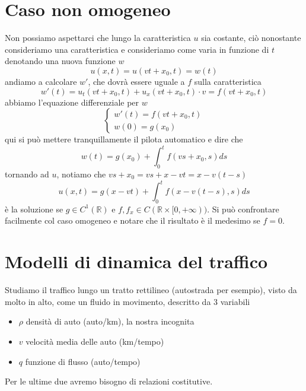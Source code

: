 \documentclass[10pt,a4paper,twoside,openright]{book}
\begin{document}
\section{Caso non omogeneo}

Non possiamo aspettarci che lungo la caratteristica $u$ sia costante, ciò nonostante consideriamo una caratteristica e consideriamo come varia in funzione di $t$ denotando una nuova funzione $w$
\begin{equation*}
	u(x,t) = u( vt+x_{0} ,t) =w( t)
\end{equation*}
andiamo a calcolare $w'$, che dovrà essere uguale a $f$ sulla caratteristica
\begin{equation*}
	w'( t) =u_{t}( vt+x_{0} ,t) +u_{x}( vt+x_{0} ,t) \cdotp v=f( vt+x_{0} ,t)
\end{equation*}
abbiamo l'equazione differenziale per $w$
\begin{equation*}
	\begin{cases}
		w'( t) =f( vt+x_{0} ,t) \\
		w( 0) =g( x_{0})        
	\end{cases}
\end{equation*}
qui si può mettere tranquillamente il pilota automatico e dire che
\begin{equation*}
	w( t) =g( x_{0}) +\int ^{t}_{0} f( vs+x_{0} ,s) ds
\end{equation*}
tornando ad $u$, notiamo che $vs+x_{0}=vs+x-vt=x-v(t-s)$
\begin{equation}
	u( x,t) =g( x-vt) +\int ^{t}_{0} f( x-v( t-s) ,s) ds
\end{equation}
è la soluzione se $g\in C^{1}(\mathbb{R})$ e $f,f_{x} \in C(\mathbb{R} \times [ 0,+\infty ))$. Si può confrontare facilmente col caso omogeneo e notare che il risultato è il medesimo se $f=0$.

\section{Modelli di dinamica del traffico}

Studiamo il traffico lungo un tratto rettilineo (autostrada per esempio), visto da molto in alto, come un fluido in movimento, descritto da $3$ variabili
\begin{itemize}
	\item $\rho $ densità di auto (auto/km), la nostra incognita
	\item $v$ velocità media delle auto (km/tempo)
	\item $q$ funzione di flusso (auto/tempo)
\end{itemize}
Per le ultime due avremo bisogno di relazioni costitutive.
\end{document}
